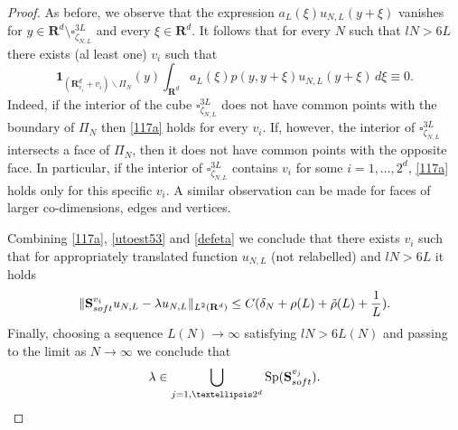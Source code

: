 \documentclass[10pt,a4paper]{amsart}
\def\RR{\R}
\newcommand\soft{{\rm soft}}
\newcommand{\R}{\mathbf{R}}
\renewcommand\AA{{\mathbf S}}
\begin{document}
\begin{proof}
	
	As before, we observe that the expression
	$a_L (\xi) u_{N,L}(y+\xi)$ vanishes for  $y \in \R^d \setminus\square^{3L}_{\zeta_{N,L}} $  and every $\xi \in \mathbf{R}^d$. It follows that for every $N$ such that $lN > 6L$ there exists (al least one) $v_i$ such that
	\begin{equation}\label{117a}
		\mathbf{1}_{(\mathbf{R}^d_{v_i}+v_i)\backslash \Pi_{N}} (y) \int_{\R^d}  a_L(\xi) p(y,y+\xi) u_{N,L}(y+\xi) \, d\xi \equiv 0.
	\end{equation}
	Indeed, if the interior of the cube $\square^{3L}_{\zeta_{N,L}}$ does not have common points with the boundary of $\Pi_N$ then \eqref{117a} holds for every $v_i$. If, however, the interior of  $\square^{3L}_{\zeta_{N,L}}$ intersects a face of $\Pi_N$, then it does not have common points with the opposite face. In particular, if the interior of  $\square^{3L}_{\zeta_{N,L}}$ contains $v_i$ for some $i=1,\dots,2^d$, \eqref{117a} holds only for this specific $v_i$. A similar observation can be made for faces of larger co-dimensions, edges and vertices.
	
	 Combining  \eqref{117a}, \eqref{utoest53} and \eqref{defeta} we conclude that there exists $v_i$ such that for appropriately translated function $u_{N,L}$ (not relabelled) and $lN > 6L$ it holds
	\begin{equation*} %
		\| \AA_{\soft}^{v_i} u_{N,L}-\lambda u_{N,L}\|_{L^2(\RR^d)} \leq C(\delta_{N} + \rho(L)  + \tilde\rho(L) + \frac{1}{L}).
	\end{equation*} 	
Finally, choosing a sequence $L(N)\to \infty$ satisfying $lN > 6L(N)$ and passing to the limit as $N\to \infty$ we conclude that
\begin{equation*} %
	 \lambda \in \bigcup_{j=1,\dots 2^d} \mathrm{Sp} (\AA_\soft^{v_j}).
\end{equation*}
\end{proof}
\end{document}
